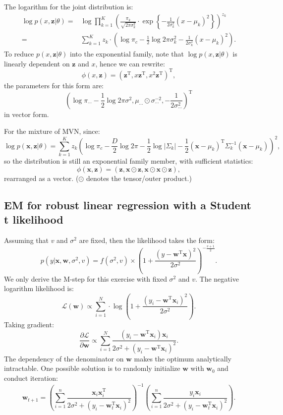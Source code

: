 \documentclass[UTF8]{ctexart}
\begin{document}
The logarithm for the joint distribution is:
\begin{align}
\log p(x,\textbf{z}|\theta)=&\log \prod_{k=1}^{K}\left(\frac{\pi_{k}}{\sqrt{2\pi \sigma_{k}^{2}}}\cdot\exp\left\{ -\frac{1}{2\sigma_{k}^{2}}(x-\mu_{k})^{2} \right\}\right)^{z_{k}}\nonumber \\
=&\sum_{k=1}^{K}z_{k}\cdot\left(\log \pi_{c} -\frac{1}{2}\log 2\pi \sigma_{k}^{2} - \frac{1}{2\sigma_{k}^{2}}(x-\mu_{k})^{2}\right).\nonumber
\end{align}
To reduce $p(x,\textbf{z}|\theta)$ into the exponential family, note that $\log p(x,\textbf{z}|\theta)$ is linearly dependent on $\textbf{z}$ and $x$, hence we can rewrite:
$$\phi(x,\textbf{z})=(\textbf{z}^{\text{T}},x\textbf{z}^{\text{T}},x^{2}\textbf{z}^{\text{T}})^{\text{T}},$$
the parameters for this form are:
$$(\log \pi_{\cdots}-\frac{1}{2}\log 2\pi\sigma^{2},\mu_{\cdots}\odot\sigma_{\cdots}^{-2},-\frac{1}{2\sigma_{\cdots}^{2}})^{\text{T}}$$
in vector form.

For the mixture of MVN, since:
$$\log p(\textbf{x},\textbf{z}|\theta)=\sum_{k=1}^{K}z_{k}\left(\log \pi_{c}-\frac{D}{2}\log 2\pi-\frac{1}{2}\log |\Sigma_{k}|-\frac{1}{2}(\textbf{x}-\mu_{k})^{\text{T}}\Sigma^{-1}_{k}(\textbf{x}-\mu_{k}) \right)^{2},$$
so the distribution is still an exponential family member, with sufficient statistics:
$$\phi(\textbf{x},\textbf{z})=(\textbf{z},\textbf{x}\odot\textbf{z},\textbf{x}\odot\textbf{x}\odot\textbf{z}),$$
rearranged as a vector.
($\odot$ denotes the tensor/outer product.)


\subsection{EM for robust linear regression with a Student t likelihood}
Assuming that $v$ and $\sigma^{2}$ are fixed, then the likelihood takes the form:
$$p(y|\textbf{x},\textbf{w},\sigma^{2},v)=f(\sigma^{2},v)\times\left(1+\frac{(y-\textbf{w}^{\text{T}}\textbf{x})^{2}}{2\sigma^{2}} \right)^{-\frac{v+1}{2}}.$$
We only derive the M-step for this exercise with fixed $\sigma^{2}$ and $v$.
The negative logarithm likelihood is:
$$\mathcal{L}(\textbf{w})\propto\sum_{i=1}^{N}\cdot \log\left(1+\frac{(y_{i}-\textbf{w}^{\text{T}}\textbf{x}_{i})^{2}}{2\sigma^{2}} \right).$$
Taking gradient:
$$\frac{\partial \mathcal{L}}{\partial \textbf{w}}\propto\sum_{i=1}^{N}\frac{(y_{i}-\textbf{w}^{\text{T}}\textbf{x}_{i})\textbf{x}_{i}}{2\sigma^{2}+(y_{i}-\textbf{w}^{\text{T}}\textbf{x}_{i})^{2}}.$$
The dependency of the denominator on $\textbf{w}$ makes the optimum analytically intractable.
One possible solution is to randomly initialize $\textbf{w}$ with $\textbf{w}_{0}$ and conduct iteration:
$$\textbf{w}_{t+1}=\left(\sum_{i=1}^{n}\frac{\textbf{x}_{i}\textbf{x}_{i}^{\text{T}}}{2\sigma^{2}+(y_{i}-\textbf{w}_{t}^{\text{T}}\textbf{x}_{i})^{2}} \right)^{-1}\left(\sum_{i=1}^{n}\frac{y_{i}\textbf{x}_{i}}{2\sigma^{2}+(y_{i}-\textbf{w}_{t}^{\text{T}}\textbf{x}_{i})^{2}} \right).$$
\end{document}
